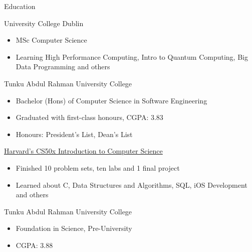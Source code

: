 \documentclass{article}
\newlength{\tabin}
\newlength{\secsep}
\newcommand{\lineunder}{\vspace*{-8pt} \\ \hspace*{-6pt} \hrulefill \\ \vspace*{-15pt}}
\newenvironment{tabbedsection}[1]{
  \begin{list}{}{
      \setlength{\itemsep}{0pt}
      \setlength{\labelsep}{0pt}
      \setlength{\labelwidth}{0pt}
      \setlength{\leftmargin}{\tabin}
      \setlength{\rightmargin}{\tabin}
      \setlength{\listparindent}{0pt}
      \setlength{\parsep}{0pt}
      \setlength{\parskip}{0pt}
      \setlength{\partopsep}{0pt}
      \setlength{\topsep}{#1}
    }
  \item[]
}{\end{list}}
\newenvironment{resume_section}[1]{
  \filbreak
  \vspace{2\secsep}
  \textsc{\large#1}
  \lineunder
  \begin{tabbedsection}{\secsep}
}{\end{tabbedsection}}
\newenvironment{resume_subsection}[2][]{
  \textbf{#2} \hfill {\footnotesize #1} \hspace{2em}
  \begin{tabbedsection}{0.5\secsep}
}{\end{tabbedsection}}
\newenvironment{subitems}{
  \renewcommand{\labelitemi}{-}
  \begin{itemize}
      \setlength{\labelsep}{1em}
}{\end{itemize}}
\begin{document}
\begin{resume_section}{Education}
  \begin{resume_subsection}{University College Dublin}
    \begin{subitems}
      \item MSc Computer Science
      \item Learning High Performance Computing, Intro to Quantum Computing, Big Data Programming and others
    \end{subitems}
  \end{resume_subsection}

  \begin{resume_subsection}{Tunku Abdul Rahman University College}
    \begin{subitems}
      \item Bachelor (Hons) of Computer Science in Software Engineering
      \item Graduated with first-class honours, CGPA: 3.83
      \item Honours: President's List, Dean's List
    \end{subitems}
  \end{resume_subsection}

  \begin{resume_subsection}[Online (2020--2021)]{\href{https://drive.google.com/file/d/1-tVq-vD20YwCcI3YgotgKKe_UYvHTwBj/view?usp=sharing}{Harvard's CS50x Introduction to Computer Science}}
    \begin{subitems}
      \item Finished 10 problem sets, ten labs and 1 final project
      \item Learned about C, Data Structures and Algorithms, SQL, iOS Development and others
    \end{subitems}
  \end{resume_subsection}

  \begin{resume_subsection}{Tunku Abdul Rahman University College}
    \begin{subitems}
      \item Foundation in Science, Pre-University
      \item CGPA: 3.88
    \end{subitems}
  \end{resume_subsection}
\end{resume_section}
\end{document}
